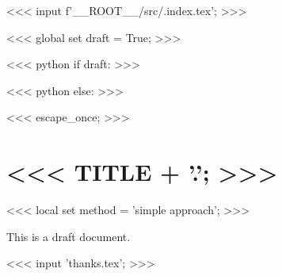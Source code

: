 <<< input f'{__ROOT__}/src/.index.tex'; >>>


<<< global set draft = True; >>>

    <<< python
    if draft:
    >>>

\newcommand{\beschreibung}[0]{a draft document}

        <<< python
        else:
        >>>

\newcommand{\beschreibung}[0]{the final version}

    <<< escape_once; >>>


    \section{<<< TITLE + '.'; >>>}

    <<< local set method = 'simple approach'; >>>

    This is \beschreibung.

    <<< input 'thanks.tex'; >>>

